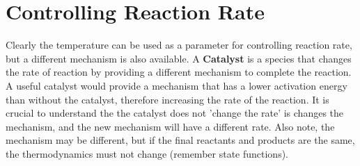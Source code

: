 \documentclass{article}
\begin{document}
\section{Controlling Reaction Rate}
Clearly the temperature can be used as a parameter for controlling reaction rate, but a different mechanism is also available. 
A \textbf{Catalyst} is a species that changes the rate  of  reaction by providing a different mechanism to complete the reaction.
A useful catalyst would provide a mechanism that has a lower activation energy than without the catalyst, therefore increasing the rate of the reaction. 
It is crucial to understand the  the catalyst does not 'change the rate' is changes the mechanism, and the new mechanism will have a different rate.
Also note, the mechanism may be different, but if the final reactants and products are the same, the thermodynamics must not change (remember state functions). 



 
\end{document}
